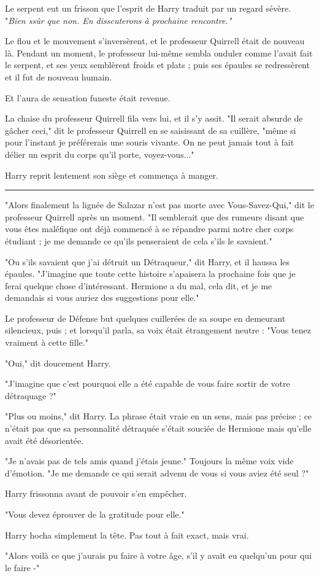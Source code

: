 Le serpent eut un frisson que l'esprit de Harry traduit par un regard sévère. "\emph{Bien ssûr que non. En disscuterons à prochaine rencontre."} 

Le flou et le mouvement s'inversèrent, et le professeur Quirrell était de nouveau là. Pendant un moment, le professeur lui-même sembla onduler comme l'avait fait le serpent, et ses yeux semblèrent froids et plats ; puis ses épaules se redressèrent et il fut de nouveau humain.

Et l'aura de sensation funeste était revenue.

La chaise du professeur Quirrell fila vers lui, et il s'y assit. "Il serait absurde de gâcher ceci," dit le professeur Quirrell en se saisissant de sa cuillère, "même si pour l'instant je préférerais une souris vivante. On ne peut jamais tout à fait délier un esprit du corps qu'il porte, voyez-vous..."

Harry reprit lentement son siège et commença à manger.
\par\noindent\rule{\textwidth}{0.4pt}
"Alors finalement la lignée de Salazar n'est pas morte avec Vous-Savez-Qui," dit le professeur Quirrell après un moment. "Il semblerait que des rumeurs disant que vous êtes maléfique ont déjà commencé à se répandre parmi notre cher corps étudiant ; je me demande ce qu'ils penseraient de cela s'ils le savaient."

"Ou s'ils savaient que j'ai détruit un Détraqueur," dit Harry, et il haussa les épaules. "J'imagine que toute cette histoire s'apaisera la prochaine fois que je ferai quelque chose d'intéressant. Hermione a du mal, cela dit, et je me demandais si vous auriez des suggestions pour elle."

Le professeur de Défense but quelques cuillerées de sa soupe en demeurant silencieux, puis ; et lorsqu'il parla, sa voix était étrangement neutre : "Vous tenez vraiment à cette fille."

"Oui," dit doucement Harry.

"J'imagine que c'est pourquoi elle a été capable de vous faire sortir de votre détraquage ?"

"Plus ou moins," dit Harry. La phrase était vraie en un sens, mais pas précise ; ce n'était pas que sa personnalité détraquée s'était souciée de Hermione mais qu'elle avait été désorientée.

"Je n'avais pas de tels amis quand j'étais jeune." Toujours la même voix vide d'émotion. "Je me demande ce qui serait advenu de vous si vous aviez été seul ?"

Harry frissonna avant de pouvoir s'en empêcher.

"Vous devez éprouver de la gratitude pour elle."

Harry hocha simplement la tête. Pas tout à fait exact, mais vrai.

"Alors voilà ce que j'aurais pu faire à votre âge, s'il y avait eu quelqu'un pour qui le faire -"

